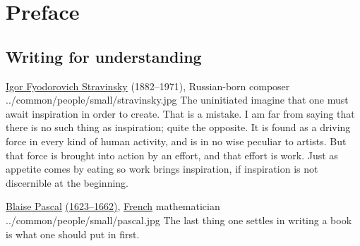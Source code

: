 ﻿%

\chapter*{Preface}

\begin{personal}

\section*{Writing for understanding}
\qboxnps
  {
    \href{http://en.wikipedia.org/wiki/Igor_Stravinsky}{Igor Fyodorovich Stravinsky}
    (1882--1971), Russian-born composer
    \footnotemark
  }
  {../common/people/small/stravinsky.jpg}
  {The uninitiated imagine that one must await inspiration in order to create.
   That is a mistake.
   I am far from saying that there is no such thing as inspiration;
   quite the opposite.
   It is found as a driving force in every kind of human activity, 
   and is in no wise peculiar to artists.
   But that force is brought into action by an effort, 
   and that effort is work.
   Just as appetite comes by eating so work brings inspiration, 
   if inspiration is not discernible at the beginning.
  }

\qboxnps
  {
    \href{http://en.wikipedia.org/wiki/Blaise_Pascal}{Blaise Pascal} 
    \href{http://www-history.mcs.st-andrews.ac.uk/Timelines/TimelineC.html}{(1623--1662)}, 
    \href{http://www-history.mcs.st-andrews.ac.uk/Countries/France.html}{French} mathematician
    \footnotemark
  }
  {../common/people/small/pascal.jpg}
  {The last thing one settles in writing a book is what one should put in first.}



\end{personal}
